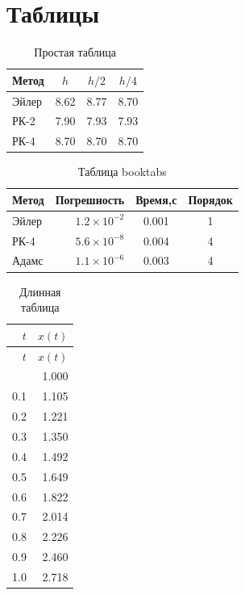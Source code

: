 \documentclass[font=modern]{cmcmsuthesis-cw}
\begin{document}
\section{Таблицы}

\begin{table}[htbp]
\caption{Простая таблица}\label{tab:simple}
\centering
\begin{tabular}{|l|c|c|c|}
\hline Метод & $h$ & $h/2$ & $h/4$ \\\hline
Эйлер & 8.62 & 8.77 & 8.70 \\\hline
РК-2 & 7.90 & 7.93 & 7.93 \\\hline
РК-4 & 8.70 & 8.70 & 8.70 \\\hline
\end{tabular}
\end{table}

\begin{table}[htbp]
\caption{Таблица booktabs}\label{tab:booktabs}
\centering
\begin{tabular}{lrcc}
\toprule
\textbf{Метод}&\textbf{Погрешность}&\textbf{Время,с}&\textbf{Порядок}\\
\midrule
Эйлер & $1.2\times10^{-2}$ & 0.001 & 1\\
РК-4  & $5.6\times10^{-8}$ & 0.004 & 4\\
Адамс & $1.1\times10^{-6}$ & 0.003 & 4\\
\bottomrule
\end{tabular}
\end{table}

\begin{longtable}{@{}rr@{}}
\caption{Длинная таблица}\label{tab:long}\\
\toprule $t$&$x(t)$\\\midrule\endfirsthead
\toprule $t$&$x(t)$\\\midrule\endhead\bottomrule\endfoot
0.0&1.000\\0.1&1.105\\0.2&1.221\\0.3&1.350\\
0.4&1.492\\0.5&1.649\\0.6&1.822\\0.7&2.014\\
0.8&2.226\\0.9&2.460\\1.0&2.718\\
\end{longtable}
\end{document}

